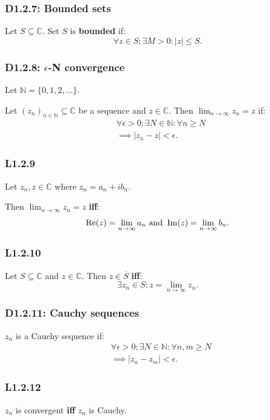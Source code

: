 \documentclass{article}
\begin{document}
\begin{multicols*}{3}
\subsubsection*{D1.2.7: Bounded sets}
Let $S\subseteq\mathbb{C}$. Set $S$ is \textbf{bounded} if:
$$\forall z\in S;\exists M>0:|z|\leq S.$$

\subsubsection*{D1.2.8: $\epsilon$-N convergence}
Let $\mathbb{N}=\{0,1,2,\dots\}$.

Let $(z_n)_{n\in\mathbb{N}}\subseteq\mathbb{C}$ be a sequence
and $z\in\mathbb{C}$.
Then $\displaystyle\lim_{n\rightarrow\infty}z_n=z$ if:
\begin{align*}
    &\forall\epsilon>0;\exists N\in\mathbb{N}:\forall n\geq N \\
    &\implies |z_n-z|<\epsilon.
\end{align*}

\subsubsection*{L1.2.9}
Let $z_n,z\in\mathbb{C}$ where $z_n=a_n+i b_n$.

Then $\displaystyle\lim_{n\rightarrow\infty}z_n=z$ \textbf{if{}f}:
$$\Re(z)=\lim_{n\rightarrow\infty}a_n
\hspace{0.05in}\text{and}\hspace{0.05in}
\Im(z)=\lim_{n\rightarrow\infty}b_n.$$

\subsubsection*{L1.2.10}
Let $S\subseteq\mathbb{C}$ and $z\in\mathbb{C}$.
Then $z\in\overline{S}$ \textbf{if{}f}:
$$\exists z_n\in S: z=\lim_{n\rightarrow\infty}z_n.$$

\subsubsection*{D1.2.11: Cauchy sequences}
$z_n$ is a Cauchy sequence if:
\begin{align*}
    &\forall\epsilon>0;\exists N\in\mathbb{N}:
    \forall n,m\geq N \\
    &\implies |z_n-z_m|<\epsilon.
\end{align*}

\subsubsection*{L1.2.12}
$z_n$ is convergent \textbf{if{}f} $z_n$ is Cauchy.


\end{multicols*}
\end{document}
